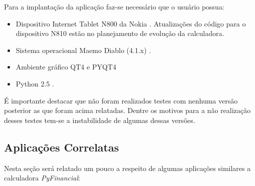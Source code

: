 
Para a implantação da aplicação faz-se necessário que o usuário possua:

\begin{itemize}
 \item Dispositivo Internet Tablet N800 da Nokia \cite{n800}. Atualizações do código para o dispositivo N810 estão no planejamento de evolução da calculadora.
 \item Sistema operacional Maemo Diablo (4.1.x) \cite{diablo}.
 \item Ambiente gráfico QT4 \cite{qt4} e PYQT4 \cite{pyqt4}
 \item Python 2.5 \cite{python}.
\end{itemize}

É importante destacar que não foram realizados testes com nenhuma versão posterior as que foram acima relatadas. Dentre os motivos para a não realização desses testes tem-se a instabilidade de algumas dessas versões.


\subsection{Aplicações Correlatas}


Nesta seção será relatado um pouco a respeito de algumas aplicações similares a calculadora \textit{PyFinancial}:

